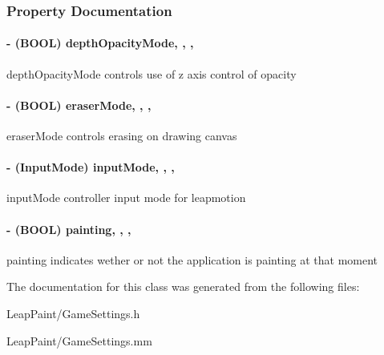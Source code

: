 \subsubsection{Property Documentation}
\hypertarget{interface_game_settings_a1ac5ddcb61e46f952ccd0e876a8578a4}{
\paragraph[{depth\-Opacity\-Mode}]{\setlength{\rightskip}{0pt plus 5cm}-\/ (B\-O\-O\-L) depth\-Opacity\-Mode\hspace{0.3cm}{\ttfamily [read]}, {\ttfamily [write]}, {\ttfamily [nonatomic]}, {\ttfamily [assign]}}}\label{d1/d0c/interface_game_settings_a1ac5ddcb61e46f952ccd0e876a8578a4}
depth\-Opacity\-Mode controls use of z axis control of opacity \hypertarget{interface_game_settings_ab192ff4717d84e69f4e3a32a4e38d6b8}{
\paragraph[{eraser\-Mode}]{\setlength{\rightskip}{0pt plus 5cm}-\/ (B\-O\-O\-L) eraser\-Mode\hspace{0.3cm}{\ttfamily [read]}, {\ttfamily [write]}, {\ttfamily [nonatomic]}, {\ttfamily [assign]}}}\label{d1/d0c/interface_game_settings_ab192ff4717d84e69f4e3a32a4e38d6b8}
eraser\-Mode controls erasing on drawing canvas \hypertarget{interface_game_settings_a57e428fbdeeb3dbffa09bb7ffcf6b057}{
\paragraph[{input\-Mode}]{\setlength{\rightskip}{0pt plus 5cm}-\/ (Input\-Mode) input\-Mode\hspace{0.3cm}{\ttfamily [read]}, {\ttfamily [write]}, {\ttfamily [nonatomic]}, {\ttfamily [assign]}}}\label{d1/d0c/interface_game_settings_a57e428fbdeeb3dbffa09bb7ffcf6b057}
input\-Mode controller input mode for leapmotion \hypertarget{interface_game_settings_a83ea5a83eca0198be2e302aa782d8cf9}{
\paragraph[{painting}]{\setlength{\rightskip}{0pt plus 5cm}-\/ (B\-O\-O\-L) painting\hspace{0.3cm}{\ttfamily [read]}, {\ttfamily [write]}, {\ttfamily [nonatomic]}, {\ttfamily [assign]}}}\label{d1/d0c/interface_game_settings_a83ea5a83eca0198be2e302aa782d8cf9}
painting indicates wether or not the application is painting at that moment 

The documentation for this class was generated from the following files\-:\begin{DoxyCompactItemize}
\item 
Leap\-Paint/Game\-Settings.\-h\item 
Leap\-Paint/Game\-Settings.\-mm\end{DoxyCompactItemize}
